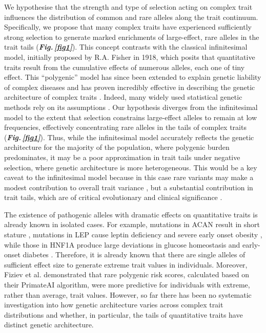 \documentclass[12pt]{zHenriquesLab-StyleBioRxiv}
\newcommand\fref[1]{\normalsize{\textbf{\textit{Fig.\,\ref{#1}}}}\normalsize{}}
\begin{document}
We hypothesise that the strength and type of selection acting on complex trait influences 
the distribution of common and rare alleles along the trait continuum. Specifically, we 
propose that many complex traits have experienced sufficiently strong selection to generate 
marked enrichments of large-effect, rare alleles in the trait tails (\fref{fig1}). 
This concept contrasts with the classical infinitesimal model, initially 
proposed \cite{Fisher1919} by R.A. Fisher in 1918, which posits that quantitative traits result 
from the cumulative effects of numerous alleles, each one of tiny effect. This “polygenic” model has 
since been extended to explain genetic liability of complex diseases and has proven incredibly 
effective in describing the genetic architecture of complex traits \cite{Wray2018,Barton2017}. 
Indeed, many widely used statistical genetic methods rely on its 
assumptions \cite{Yang2011,BulikSullivan2015,Choi2020}. Our hypothesis diverges 
from the infinitesimal model to the extent that selection constrains large-effect alleles 
to remain at low frequencies, effectively concentrating rare alleles in the tails of complex traits (\fref{fig1}). 
Thus, while the infinitesimal model accurately reflects the genetic architecture for the 
majority of the population, where polygenic burden predominates, it may be a poor approximation 
in trait tails under negative selection, where genetic architecture is more heterogeneous. 
This would be a key caveat to the infinitesimal model because in this case rare variants may 
make a modest contribution to overall trait variance \cite{Weiner2023}, but a substantial 
contribution in trait tails, which are of critical evolutionary and clinical 
significance \cite{Kingsolver2007,Ference2018,Kyrou2000}. 



The existence of pathogenic alleles with dramatic effects on quantitative 
traits is already known in isolated cases. For example, mutations in ACAN 
result in short stature \cite{vanDerSteen2017}, mutations in LEP cause leptin 
deficiency and severe early onset obesity \cite{Saeed2015}, while those in HNF1A 
produce large deviations in glucose homeostasis and early-onset diabetes \cite{Miyachi2022}. 
Therefore, it is already known that there are single alleles of sufficient effect size 
to generate extreme trait values in individuals. Moreover, Fiziev et al. \cite{Fiziev2023} 
demonstrated that rare polygenic risk scores, calculated based on their PrimateAI algorithm, 
were more predictive for individuals with extreme, rather than average, trait values. 
However, so far there has been no systematic investigation into how genetic architecture varies 
across complex trait distributions and whether, in particular, the tails of quantitative traits have distinct genetic architecture. 
\end{document}
